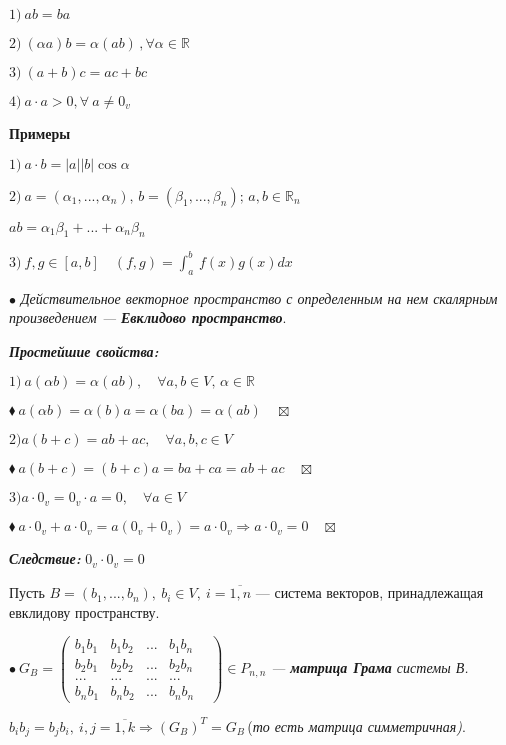 \documentclass[a4paper, 12pt]{report}
\begin{document}
	$1)\ ab=ba$
	
	$2)\ (\alpha a)b=\alpha(ab)\, , \forall \alpha \in \mathbb{R}$
	
	$3)\ (a+b)c=ac+bc$
	
	$4)\ a\cdot a>0, \forall\ a \ne 0_v$
	\par \bigskip
	\textbf{Примеры}
	
	$1)\ a \cdot b =|a||b| \cos{\alpha}$
	
	$2)\ a=(\alpha_1,...,\alpha_n), \, b=(\beta_1,...,\beta_n);\, a,b \in \mathbb{R}_n$
	
	$ab=\alpha_1 \beta_1 +...+ \alpha_n \beta_n$
	
	$3)\ f,g \in [a,b] \quad (f,g)= \int_a^b \, f(x) g(x) dx$
	\par \bigskip
	$\bullet$\textit{ Действительное векторное пространство с определенным на нем скалярным произведением --- \textbf{Евклидово пространство}}.
	\par \bigskip
	\textit{\textbf{Простейшие свойства:}}
	
	$1)\ a(\alpha b)=\alpha(ab), \quad \forall a,b \in V, \, \alpha \in \mathbb{R}$
	\par \bigskip
	$\blacklozenge\ a(\alpha b)=\alpha(b)a=\alpha(ba)=\alpha(ab) \quad \boxtimes $
	\par \bigskip
	$2) a(b+c)=ab+ac, \quad \forall a,b,c \in V$
	\par \bigskip
	$\blacklozenge\ a(b+c)=(b+c)a=ba+ca=ab+ac \quad \boxtimes $
	\par \bigskip
	$3) a\cdot 0_v=0_v \cdot a =0, \quad \forall a \in V$
	\par \bigskip
	$\blacklozenge\  a\cdot 0_v+ a\cdot 0_v= a(0_v+0_v)=a \cdot 0_v \Rightarrow  a\cdot 0_v=0\quad\boxtimes$
	\par \bigskip
	\textit{\textbf{Следствие: }}
	$0_v \cdot 0_v =0$
	\par \bigskip
	Пусть $B=(b_1,...,b_n),\ b_i \in V,\ i=\overline{1,n}$ --- система векторов, принадлежащая евклидову пространству.
	
	$\bullet\ G_B=
	\begin{pmatrix}
		b_1 b_1 & b_1 b_2 & ... & b_1 b_n\\
		b_2 b_1 & b_2 b_2&...& b_2 b_n\\
		...&...&...&...&\\
		b_n b_1 &b_n b_2 &...&b_n b_n
	\end{pmatrix} \in P_{n,n}$\textit{ --- \textbf{матрица Грама} системы В.}
	
	$b_i b_j =b_j b_i, \ i,j=\overline{1,k} \Rightarrow (G_B)^T=G_B \,$(\textit{то есть матрица симметричная)}.
	
\end{document}
